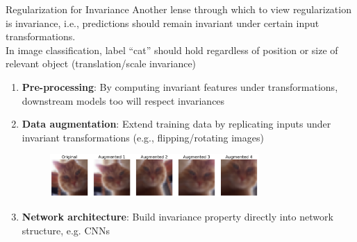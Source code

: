 \documentclass[11pt,compress,t,notes=noshow, xcolor=table]{beamer}
\begin{document}
\begin{vbframe}{Regularization for Invariance}
Another lense through which to view regularization is invariance, i.e., predictions should remain invariant under certain input transformations.\\
In image classification, label ``cat'' should hold regardless of position or size of relevant object (translation/scale invariance)
\begin{enumerate}\setlength\itemsep{1.02em}
    \item \textbf{Pre-processing}: By computing invariant features under transformations, downstream models too will respect invariances
    \item \textbf{Data augmentation}: Extend training data by replicating inputs under invariant transformations (e.g., flipping/rotating images)
    \begin{figure}
    \includegraphics[width=0.75\textwidth]{figure_man/data-augmentation-cat.png}\\
    \end{figure}
    \item \textbf{Network architecture}: Build invariance property directly into network structure, e.g. CNNs 
\end{enumerate}


\end{vbframe}

\endlecture
\end{document}

